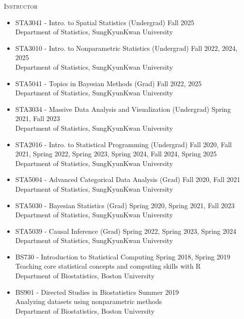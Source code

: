 \documentclass[10pt]{article}
\newenvironment{innerlist}[1][\enskip\textbullet]%
        {\begin{itemize}[#1,leftmargin=*,parsep=0pt,itemsep=0pt,topsep=0pt,partopsep=0pt]}
        {\end{itemize}}
\begin{document}
\textsc{Instructor} 
\begin{innerlist}
\item[] STA3041 - Intro. to Spatial Statistics (Undergrad) \hfill {Fall 2025}\\
        Department of Statistics, SungKyunKwan University\\
\item[] STA3010 - Intro. to Nonparametric Statistics (Undergrad) \hfill {Fall 2022, 2024, 2025}\\
        Department of Statistics, SungKyunKwan University\\
\item[] STA5041 - Topics in Bayesian Methods (Grad) \hfill {Fall 2022, 2025}\\
        Department of Statistics, SungKyunKwan University\\
\item[] STA3034 - Massive Data Analysis and Visualization (Undergrad) \hfill {Spring 2021, Fall 2023}\\
        Department of Statistics, SungKyunKwan University\\
\item[] STA2016 - Intro. to Statistical Programming (Undergrad) \hfill {Fall 2020, Fall 2021, Spring 2022, Spring 2023, Spring 2024, Fall 2024, Spring 2025}\\
        Department of Statistics, SungKyunKwan University\\
\item[] STA5004 - Advanced Categorical Data Analysis (Grad) \hfill {Fall 2020, Fall 2021}\\
        Department of Statistics, SungKyunKwan University\\
\item[] STA5030 - Bayesian Statistics (Grad) \hfill {Spring 2020, Spring 2021, Fall 2023}\\
        Department of Statistics, SungKyunKwan University\\
\item[] STA5039 - Causal Inference (Grad) \hfill {Spring 2022, Spring 2023, Spring 2024}\\
	Department of Statistics, SungKyunKwan University\\
\item[] BS730 - Introduction to Statistical Computing \hfill {Spring 2018, Spring 2019}\\ 
        Teaching core statistical concepts and computing skills with R\\
        Department of Biostatistics, Boston University\\
\item[] BS901 - Directed Studies in Biostatistics \hfill {Summer 2019}\\
	Analyzing datasets using nonparametric methods\\
	Department of Biostatistics, Boston University\\
\end{innerlist}
\end{document}
